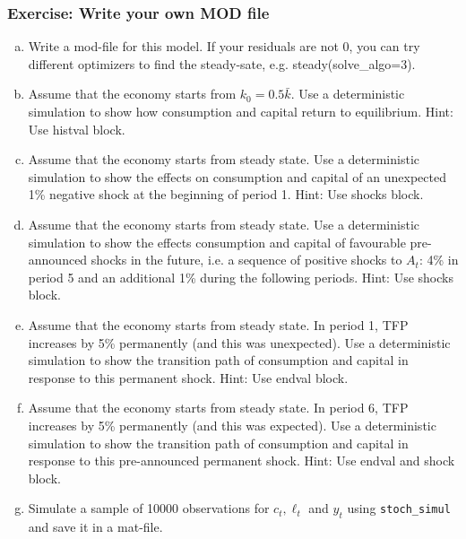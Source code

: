\documentclass[handout]{beamer}  %
\begin{document}
\begin{frame}[shrink]\frametitle{Exercise: Write your own MOD file}\footnotesize
	\begin{enumerate}[(a)]
		\item Write a mod-file for this model. If your residuals are not 0, you can try different optimizers to find the steady-sate, e.g. steady(solve\_algo=3).
		\item Assume that the economy starts from $k_0=0.5 \bar{k}$. Use a deterministic simulation to show how consumption and capital return to equilibrium. Hint: Use histval block.
		\item Assume that the economy starts from steady state. Use a deterministic simulation to show the effects on consumption and capital of an unexpected 1\% negative shock at the beginning of period 1. Hint: Use shocks block.
		\item Assume that the economy starts from steady state. Use a deterministic simulation to show the effects consumption and capital of favourable pre-announced shocks in the future, i.e. a sequence of positive shocks to $A_t$: 4\% in period 5 and an additional 1\% during the following periods. Hint: Use shocks block.
		\item Assume that the economy starts from steady state. In period 1, TFP increases by 5\% permanently (and this was unexpected). Use a deterministic simulation to show the transition path of consumption and capital in response to this permanent shock. Hint: Use endval block.
		\item Assume that the economy starts from steady state. In period 6, TFP increases by 5\% permanently (and this was expected). Use a deterministic simulation to show the transition path of consumption and capital in response to this pre-announced permanent shock. Hint: Use endval and shock block.
		\item Simulate a sample of 10000 observations for $c_t,\ell_t$ and $y_t$ using \texttt{stoch\_simul} and save it in a mat-file.
	\end{enumerate}
\end{frame}
\end{document}
